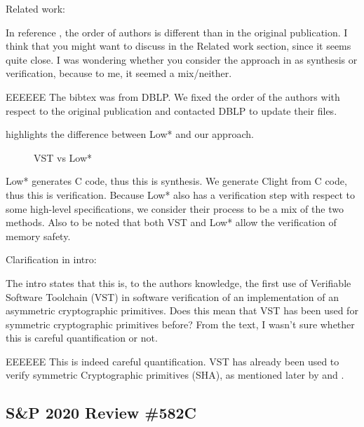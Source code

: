 Related work:

\newcommand{\rbar}{\cite{DBLP:journals/corr/BhargavanDFHPRR17}}

In reference \rbar, the order of authors is different than
in the original publication. I think that you might want to
discuss \rbar in the Related work section, since it seems quite
close. I was wondering whether you consider the approach
in \rbar as synthesis or verification, because to me, it seemed
a mix/neither.

\begin{answer}{EEEEEE}
  The bibtex was from DBLP. We fixed the order of the
  authors with respect to the original publication and contacted
  DBLP to update their files.

   highlights the difference between Low*
  and our approach.

  \begin{figure}[H]
    \centering
    
    \caption{VST vs Low*}
    \label{tikz:LowVST}
  \end{figure}

  Low* generates C code, thus this is synthesis. We generate
  Clight from C code, thus this is verification. Because Low*
  also has a verification step with respect to some high-level
  specifications, we consider their process to be a mix of the
  two methods. Also to be noted that both VST and Low*
  allow the verification of memory safety.
\end{answer}

Clarification in intro:

The intro states that this is, to the authors knowledge, the
first use of Verifiable Software Toolchain (VST) in software
verification of an implementation of an asymmetric cryptographic
primitives. Does this mean that VST has been used
for symmetric cryptographic primitives before? From the text,
I wasn’t sure whether this is careful quantification or not.

\begin{answer}{EEEEEE}
  This is indeed careful quantification. VST has already
  been used to verify symmetric Cryptographic primitives
  (\eg SHA), as mentioned later by \cite{Beringer2015VerifiedCA} and \cite{2015-Appel}.
\end{answer}


\subsection{S\&P 2020 Review \#582C}


